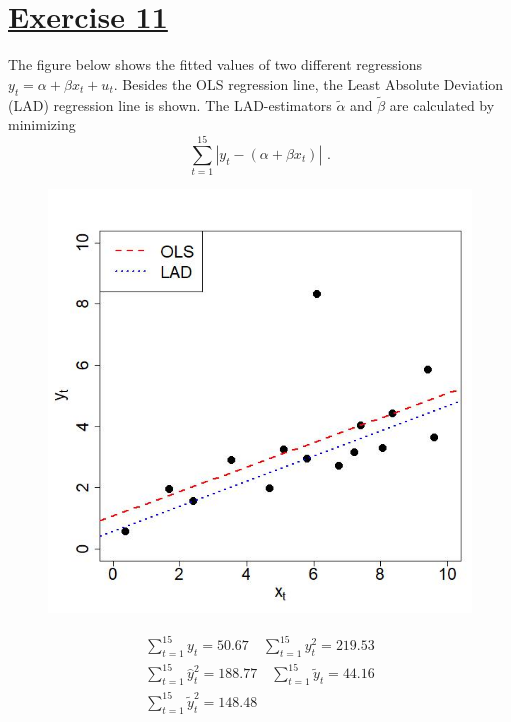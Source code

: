 \documentclass[captions=tableheading, 12pt, headings=small, parskip=half]{scrartcl}
\begin{document}
\section*{\underline{Exercise 11}}
The figure below shows the fitted values of two different regressions $y_t = \alpha + \beta x_t + u_t$. Besides the OLS regression line, the Least Absolute Deviation (LAD) regression line is shown. The LAD-estimators $\tilde{\alpha}$ and $\tilde{\beta}$ are calculated by minimizing
\[
\sum_{t = 1}^{15}{|y_t - (\alpha + \beta x_t)|}\text{ .}
\]
\begin{figure}[h!]
	\begin{minipage}{0.49\columnwidth}
		\includegraphics[width = \columnwidth]{Code1/LADreg.jpeg}
	\end{minipage}
	\hfill
	\begin{minipage}{0.49\columnwidth}
		\begin{align*}
		\sum_{t = 1}^{15}{y_t} = 50.67 \quad \sum_{t = 1}^{15}{y_t^2} = 219.53\\
		\sum_{t = 1}^{15}{\hat{y}_t^2} = 188.77 \quad \sum_{t = 1}^{15}{\tilde{y}_t} = 44.16\\
		\sum_{t = 1}^{15}{\tilde{y}_t^2} = 148.48
		\end{align*}
	\end{minipage}
\end{figure}
\end{document}
